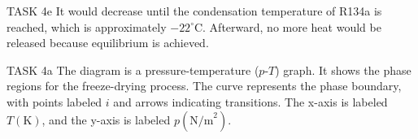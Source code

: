 TASK 4e  
It would decrease until the condensation temperature of R134a is reached, which is approximately \( -22^\circ \text{C} \). Afterward, no more heat would be released because equilibrium is achieved.

TASK 4a  
The diagram is a pressure-temperature (\( p \)-\( T \)) graph. It shows the phase regions for the freeze-drying process. The curve represents the phase boundary, with points labeled \( i \) and arrows indicating transitions. The x-axis is labeled \( T(\text{K}) \), and the y-axis is labeled \( p(\text{N/m}^2) \).